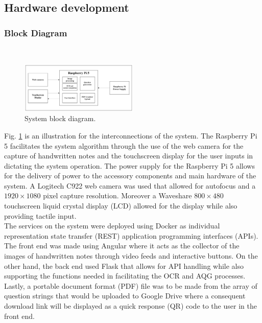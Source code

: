 \documentclass[conference]{IEEEtran}
\begin{document}
\subsection{Hardware development} 
\subsubsection{Block Diagram}
\hfill \\
\vspace{-0.4cm}
\begin{figure}[H]
\centerline{\includegraphics[width=0.5\textwidth]{blockdiag.png}}
\vspace{-0.4cm}
\caption{System block diagram.} 
\label{blockdiag}
\end{figure}
\indent Fig. \ref{blockdiag} is an illustration for the interconnections 
of the system. The Raspberry Pi 5 facilitates the system algorithm 
through the use of the web camera for the capture of handwritten notes and 
the touchscreen display for the user inputs in dictating the system 
operation. The power supply for the Raspberry Pi 5 allows for the delivery 
of power to the accessory components and main hardware of the system.
A Logitech C922 web camera was used that allowed for autofocus 
and a $1920\times 1080$ pixel capture resolution. Moreover a 
Waveshare $800\times480$ touchscreen liquid crystal display (LCD) 
allowed for the display while also providing tactile input.\\
\indent The services on the system were deployed using Docker as 
individual representation state transfer (REST) application programming 
interfaces (APIs). The front end was made using Angular where it acts 
as the collector of the images of handwritten notes through video feeds 
and interactive buttons. On the other hand, the back end used Flask 
that allows for API handling while also supporting the functions needed 
in facilitating the OCR and AQG processes. Lastly, a portable document 
format (PDF) file was to be made from the array of question strings that 
would be uploaded to Google Drive where a consequent download link 
will be displayed as a quick response (QR) code to the user in the 
front end.
\end{document}
